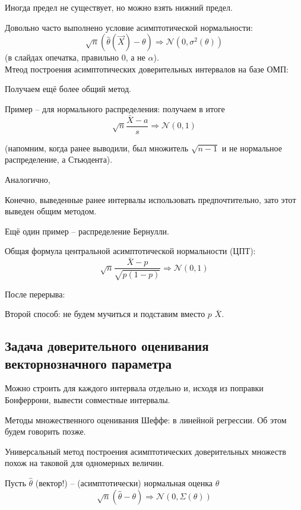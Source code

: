 \documentclass[main.tex]{subfiles}
\begin{document}
Иногда предел не существует, но можно взять нижний предел.

Довольно часто выполнено условие асимптотической нормальности:
\[ \sqrt n ( \hat \theta (\vec X) - \theta ) \Rightarrow \mathcal N (0, \sigma^2(\theta)) \] 
(в слайдах опечатка, правильно $ 0 $, а не $ \alpha $). \\

Мтеод построения асимптотических доверительных интервалов на базе ОМП:


Получаем ещё более общий метод.

Пример -- для нормального распределения: получаем в итоге
\[ \sqrt{n}\frac{\bar X - a}{s} \Rightarrow \mathcal N(0, 1) \]

(напомним, когда ранее выводили, был множитель $ \sqrt{n-1} $ и не нормальное распределение, а Стьюдента).

Аналогично,
\[ \]

Конечно, выведенные ранее интервалы использовать предпочтительно, зато этот выведен общим методом.

Ещё один пример -- распределение Бернулли. %

Общая формула центральной асимптотической нормальности (ЦПТ):
\[ \sqrt n \frac{\bar X - p}{\sqrt{ p(1-p) }} \Rightarrow \mathcal N (0, 1) \]


\Large{После перерыва:}
\normalsize

Второй способ: не будем мучиться и подставим вместо $ p $ $ \bar X $.

\subsection{Задача доверительного оценивания векторнозначного параметра}

Можно строить для каждого интервала отдельно и, исходя из поправки Бонферрони, вывести совместные интервалы.

Методы множественного оценивания Шеффе: в линейной регрессии.
Об этом будем говорить позже.

Универсальный метод построения асимптотических доверительных множеств похож на таковой для одномерных величин.

Пусть $ \hat \theta $ (вектор!) -- (асимптотически) нормальная оценка $ \theta $
\[ \sqrt n (\hat \theta - \theta) \Rightarrow \mathcal{N}(0, \Sigma(\theta)) \]
\end{document}
